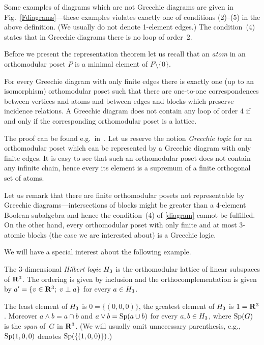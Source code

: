 Some examples of diagrams which are not Greechie diagrams are given in
Fig.~\ref{Fdiagrams}---these examples violates exactly one of conditions
(2)--(5) in the above definition. (We usually do not denote 1-element
edges.) The condition~(4) states that in Greechie diagrams there is no loop
of order~2.

Before we present the representation theorem let us recall that an {\em
atom\/} in an orthomodular poset $P$ is a minimal element of $P \setminus
\{0\}$.


\begin {theorem}
For every Greechie diagram with only finite edges there is exactly one (up
to an isomorphism) orthomodular poset such that there are one-to-one
correspondences between vertices and atoms and between edges and blocks
which preserve incidence relations. A Greechie diagram does not contain any
loop of order 4 if and only if the corresponding orthomodular poset is a
lattice.
\end {theorem}


The proof can be found e.g.\ in~\cite{NR}. Let us reserve the notion {\em
Greechie logic\/} for an orthomodular poset which can be represented by a
Greechie diagram with only finite edges. It is easy to see that such an
orthomodular poset does not contain any infinite chain, hence every its
element is a supremum of a finite orthogonal set of atoms.

Let us remark that there are finite orthomodular posets not representable by
Greechie diagrams---intersections of blocks might be greater than a
4-element Boolean subalgebra and hence the condition~(4) of \ref{diagram}
cannot be fulfilled. On the other hand, every orthomodular poset with only
finite and at most 3-atomic blocks (the case we are interested about) is a
Greechie logic.

We will have a special interest about the following example.


\begin {definition}
The 3-dimensional {\em Hilbert logic\/} $H_3$ is the orthomodular lattice
of linear subspaces of ${\bf R}^3$. The ordering is given by inclusion and the
orthocomplementation is given by $a'= \{v\in{\bf R}^3;\; v\perp a \}$ for every
$a \in H_3$.
\end {definition}


The least element of $H_3$ is $0 = \{(0,0,0)\}$, the greatest element of $H_3$
is $1 = {\bf R}^3$. Moreover $a \land b = a \cap b$ and $a \lor b = {\rm Sp}(a\cup b)$
for every $a,b \in H_3$, where ${\rm Sp} (G)$ is the {\em span\/} of~$G$ in
${\bf R}^3$. (We will usually omit unnecessary parenthesis, e.g., ${\rm Sp} (1,0,0)$
denotes ${\rm Sp} (\{(1,0,0)\})$.)

